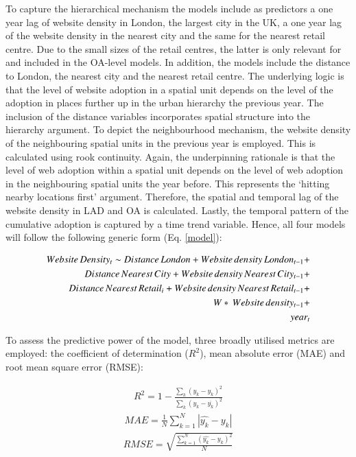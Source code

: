 \documentclass[
  authoryear,
  preprint,
  3p]{elsarticle}
\begin{document}
To capture the hierarchical mechanism the models include as predictors a
one year lag of website density in London, the largest city in the UK, a
one year lag of the website density in the nearest city and the same for
the nearest retail centre. Due to the small sizes of the retail centres,
the latter is only relevant for and included in the OA-level models. In
addition, the models include the distance to London, the nearest city
and the nearest retail centre. The underlying logic is that the level of
website adoption in a spatial unit depends on the level of the adoption
in places further up in the urban hierarchy the previous year. The
inclusion of the distance variables incorporates spatial structure into
the hierarchy argument. To depict the neighbourhood mechanism, the
website density of the neighbouring spatial units in the previous year
is employed. This is calculated using rook continuity. Again, the
underpinning rationale is that the level of web adoption within a
spatial unit depends on the level of web adoption in the neighbouring
spatial units the year before. This represents the `hitting nearby
locations first' argument. Therefore, the spatial and temporal lag of
the website density in LAD and OA is calculated. Lastly, the temporal
pattern of the cumulative adoption is captured by a time trend variable.
Hence, all four models will follow the following generic form (Eq.
\ref{model}):

\begin{align} \label{model}
Website\,Density_{t} \sim Distance\,London +
Website\,density\,London_{t-1} +\notag\\
Distance\,Nearest\,City +
Website\,density\,Nearest\,City_{t-1} +\notag\\
Distance\,Nearest\,Retail_{i} +
Website\,density\,Nearest\,Retail_{t-1} +\notag\\
W*\, Website\,density_{t-1} +\notag\\ 
year_{t}
\end{align}

To assess the predictive power of the model, three broadly utilised
metrics are employed: the coefficient of determination (\(R^2\)), mean
absolute error (MAE) and root mean square error (RMSE):

\begin{align}
R^2 = 1 - \frac{\sum_{k} (y_{k} - \hat{y_{k}})^2} {\sum_{k} (y_{k} - \overline{y_{k}})^2} \label{eq:rsquared}
\end{align} \begin{align}
MAE = \frac{1}{N} \sum_{k = 1}^{N} |\hat{y_{k}} - y_{k}| \label{eq:mae}
\end{align} \begin{align}
RMSE =  \sqrt{\frac{\sum_{k = 1}^{N} (\hat{y_{k}} - y_{k})^2} {N}} \label{eq:rmse}
\end{align}
\end{document}
